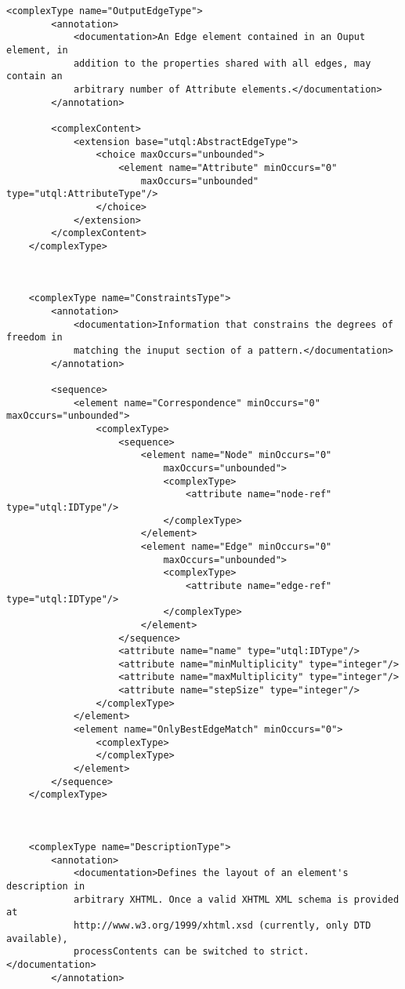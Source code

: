 \documentclass[11pt]{article}
\begin{document}
\begin{Verbatim}[fontsize=\footnotesize,tabsize=2]
    <complexType name="OutputEdgeType">
        <annotation>
            <documentation>An Edge element contained in an Ouput element, in
            addition to the properties shared with all edges, may contain an
            arbitrary number of Attribute elements.</documentation>
        </annotation>
        
        <complexContent>
            <extension base="utql:AbstractEdgeType">
                <choice maxOccurs="unbounded">
                    <element name="Attribute" minOccurs="0" 
						maxOccurs="unbounded" type="utql:AttributeType"/>
                </choice>
            </extension>
        </complexContent>
    </complexType>
    
    
    
    <complexType name="ConstraintsType">
        <annotation>
            <documentation>Information that constrains the degrees of freedom in
            matching the inuput section of a pattern.</documentation>
        </annotation>
        
        <sequence>
            <element name="Correspondence" minOccurs="0" maxOccurs="unbounded">
                <complexType>
                    <sequence>
                        <element name="Node" minOccurs="0"
							maxOccurs="unbounded">
                            <complexType>
                                <attribute name="node-ref" type="utql:IDType"/>
                            </complexType>
                        </element>
                        <element name="Edge" minOccurs="0"
							maxOccurs="unbounded">
                            <complexType>
                                <attribute name="edge-ref" type="utql:IDType"/>
                            </complexType>
                        </element>
                    </sequence>
                    <attribute name="name" type="utql:IDType"/>
                    <attribute name="minMultiplicity" type="integer"/>
                    <attribute name="maxMultiplicity" type="integer"/>
                    <attribute name="stepSize" type="integer"/>
                </complexType>
            </element>
            <element name="OnlyBestEdgeMatch" minOccurs="0">
                <complexType>
                </complexType>
            </element>
        </sequence>
    </complexType>
    
    
    
    <complexType name="DescriptionType">
        <annotation>
            <documentation>Defines the layout of an element's description in
            arbitrary XHTML. Once a valid XHTML XML schema is provided at
            http://www.w3.org/1999/xhtml.xsd (currently, only DTD available),
            processContents can be switched to strict. </documentation>
        </annotation>
        

\end{Verbatim}
\end{document}
